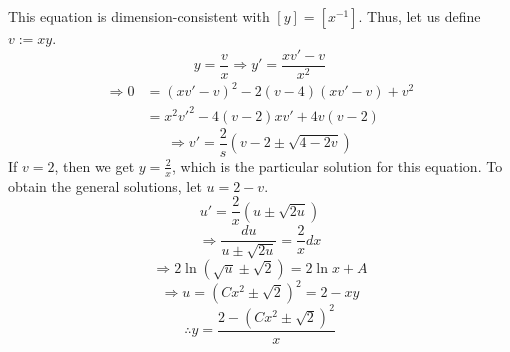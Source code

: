 \item

This equation is dimension-consistent with $[y] = [x^{-1}]$.
Thus, let us define $v := xy$.
\[
	y = \frac{v}{x}
	\Rightarrow y' = \frac{xv' - v}{x^2}
\]
\begin{align*}
	\Rightarrow 0
	&= {\left( xv' - v \right)}^2 - 2(v - 4)\left( xv' - v\right) + v^2 \\
	&= x^2 v'^2 - 4(v - 2) x v' + 4v(v - 2)
\end{align*}
\[
	\Rightarrow v' = \frac{2}{s}\left( v - 2 \pm \sqrt{4 - 2v} \right)
\]
If $v = 2$, then we get $y = \frac{2}{x}$, which is the particular solution for this equation.
To obtain the general solutions, let $u = 2 - v$.
\[
	u' = \frac{2}{x} \left( u \pm \sqrt{2u} \right)
\]
\[
	\Rightarrow \frac{du}{u \pm \sqrt{2u}} = \frac{2}{x} dx
\]
\[
	\Rightarrow 2 \ln \left( \sqrt{u} \pm \sqrt{2} \right) = 2 \ln x + A
\]
\[
	\Rightarrow u = {\left( Cx^2 \pm \sqrt{2} \right)}^2 = 2 - xy
\]
\[
	\therefore y = \frac{2 - {\left( Cx^2 \pm \sqrt{2} \right)}^2}{x}
\]